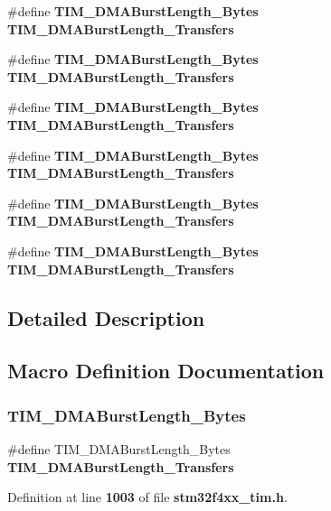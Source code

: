 \begin{DoxyCompactItemize}
\item 
\#define \textbf{ T\+I\+M\+\_\+\+D\+M\+A\+Burst\+Length\+\_\+Bytes}~\textbf{ T\+I\+M\+\_\+\+D\+M\+A\+Burst\+Length\+\_\+Transfers}
\item 
\#define \textbf{ T\+I\+M\+\_\+\+D\+M\+A\+Burst\+Length\+\_\+Bytes}~\textbf{ T\+I\+M\+\_\+\+D\+M\+A\+Burst\+Length\+\_\+Transfers}
\item 
\#define \textbf{ T\+I\+M\+\_\+\+D\+M\+A\+Burst\+Length\+\_\+Bytes}~\textbf{ T\+I\+M\+\_\+\+D\+M\+A\+Burst\+Length\+\_\+Transfers}
\item 
\#define \textbf{ T\+I\+M\+\_\+\+D\+M\+A\+Burst\+Length\+\_\+Bytes}~\textbf{ T\+I\+M\+\_\+\+D\+M\+A\+Burst\+Length\+\_\+Transfers}
\item 
\#define \textbf{ T\+I\+M\+\_\+\+D\+M\+A\+Burst\+Length\+\_\+Bytes}~\textbf{ T\+I\+M\+\_\+\+D\+M\+A\+Burst\+Length\+\_\+Transfers}
\item 
\#define \textbf{ T\+I\+M\+\_\+\+D\+M\+A\+Burst\+Length\+\_\+Bytes}~\textbf{ T\+I\+M\+\_\+\+D\+M\+A\+Burst\+Length\+\_\+Transfers}
\end{DoxyCompactItemize}


\subsection{Detailed Description}


\subsection{Macro Definition Documentation}
\mbox{\label{group__TIM__Legacy_ga99141ca3210700d07d098d161b42cdf3}} 
\subsubsection{T\+I\+M\+\_\+\+D\+M\+A\+Burst\+Length\+\_\+Bytes}
{\footnotesize\ttfamily \#define T\+I\+M\+\_\+\+D\+M\+A\+Burst\+Length\+\_\+Bytes~\textbf{ T\+I\+M\+\_\+\+D\+M\+A\+Burst\+Length\+\_\+Transfers}}



Definition at line \textbf{ 1003} of file \textbf{ stm32f4xx\+\_\+tim.\+h}.

